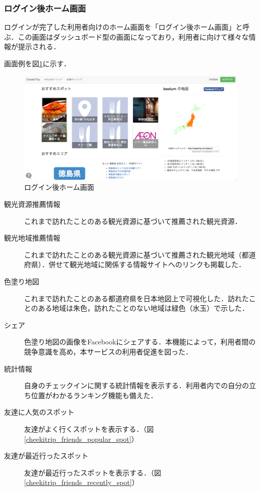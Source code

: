 \documentclass{jsarticle}
\begin{document}
\subsubsection{ログイン後ホーム画面}

ログインが完了した利用者向けのホーム画面を「ログイン後ホーム画面」と呼ぶ．この画面はダッシュボード型の画面になっており，利用者に向けて様々な情報が提示される．

画面例を図\ref{cheekitrip_home}に示す．

\begin{figure}[h!]
\begin{center}
\includegraphics[width=12.0cm]{./image/cheekitrip_home.png}
\caption{ログイン後ホーム画面}
\label{cheekitrip_home}
\end{center}
\end{figure}

\begin{description}
\item[観光資源推薦情報] これまで訪れたことのある観光資源に基づいて推薦された観光資源．
\item[観光地域推薦情報] これまで訪れたことのある観光資源に基づいて推薦された観光地域（都道府県）．併せて観光地域に関係する情報サイトへのリンクも掲載した．
\item[色塗り地図] これまで訪れたことのある都道府県を日本地図上で可視化した．訪れたことのある地域は朱色，訪れたことのない地域は緑色（水玉）で示した．
\item[シェア] 色塗り地図の画像をFacebookにシェアする．本機能によって，利用者間の競争意識を高め，本サービスの利用者促進を図った．
\item[統計情報] 自身のチェックインに関する統計情報を表示する．利用者内での自分の立ち位置がわかるランキング機能も備えた．
\item[友達に人気のスポット] 友達がよく行くスポットを表示する．（図\ref{cheekitrip_friends_popular_spot}）
\item[友達が最近行ったスポット] 友達が最近行ったスポットを表示する．（図\ref{cheekitrip_friends_recently_spot}）
\end{description}
\end{document}
